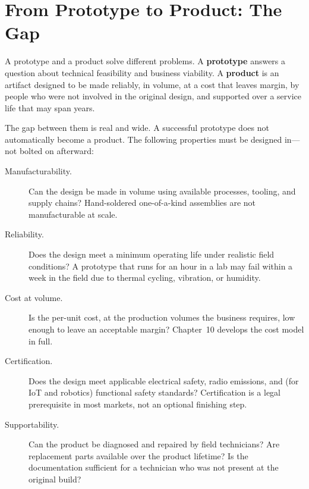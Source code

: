 \section{From Prototype to Product: The Gap}
\label{sec:ch1-proto-to-product}

A prototype and a product solve different problems.
A \textbf{prototype} answers a question about technical
feasibility and business viability.
A \textbf{product} is an artifact designed to be made
reliably, in volume, at a cost that leaves margin, by people who were not
involved in the original design, and supported over a service life that
may span years.

The gap between them is real and wide.
A successful prototype does not automatically become a product.
The following properties must be designed in---not bolted on afterward:

\begin{description}
  \item[Manufacturability.] Can the design be made in volume using
        available processes, tooling, and supply chains?
        Hand-soldered one-of-a-kind assemblies are not manufacturable
        at scale.

  \item[Reliability.] Does the design meet a minimum operating life
        under realistic field conditions?
        A prototype that runs for an hour in a lab may fail within a
        week in the field due to thermal cycling, vibration, or humidity.

  \item[Cost at volume.] Is the per-unit cost, at the production volumes
        the business requires, low enough to leave an acceptable margin?
        Chapter~10 develops the cost model in full.

  \item[Certification.] Does the design meet applicable electrical
        safety, radio emissions, and (for IoT and robotics) functional
        safety standards?
        Certification is a legal prerequisite in most markets, not an
        optional finishing step.

  \item[Supportability.] Can the product be diagnosed and repaired by
        field technicians?
        Are replacement parts available over the product lifetime?
        Is the documentation sufficient for a technician who was not
        present at the original build?
\end{description}

